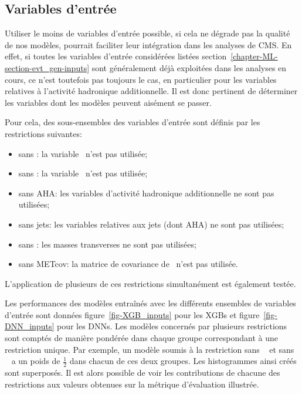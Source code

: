 \subsection{Variables d'entrée}\label{chapter-ML-section-hyperparameters-inputs}
Utiliser le moins de variables d'entrée possible,
si cela ne dégrade pas la qualité de nos modèles,
pourrait faciliter leur intégration dans les analyses de CMS.
En effet,
si toutes les variables d'entrée considérées listées section~\ref{chapter-ML-section-evt_gen-inputs}
sont généralement déjà exploitées dans les analyses en cours,
ce n'est toutefois pas toujours le cas, en particulier pour les variables relatives à l'activité hadronique additionnelle.
Il est donc pertinent de déterminer les variables dont les modèles peuvent aisément se passer.
\par
Pour cela, des sous-ensembles des variables d'entrée sont définis par les restrictions suivantes:
\begin{itemize}
\item sans \Npu: la variable \Npu\ n'est pas utilisée;
\item sans \Nnu: la variable \Nnu\ n'est pas utilisée;
\item sans AHA: les variables d'activité hadronique additionnelle ne sont pas utilisées;
\item sans jets: les variables relatives aux jets (dont AHA) ne sont pas utilisées;
\item sans \mT: les masses transverses ne sont pas utilisées;
\item sans METcov: la matrice de covariance de \MET\ n'est pas utilisée.
\end{itemize}
L'application de plusieurs de ces restrictions simultanément est également testée.
\par
Les performances des modèles entraînés avec les différents ensembles de variables d'entrée sont données
figure~\ref{fig-XGB_inputs} pour les XGBs
et
figure~\ref{fig-DNN_inputs}
pour les DNNs.
Les modèles concernés par plusieurs restrictions sont comptés de manière pondérée dans chaque groupe correspondant à une restriction unique.
Par exemple, un modèle soumis à la restriction \og sans \Npu\ \fg{} et \og sans \Nnu\ \fg{} a un poids de $\frac{1}{2}$ dans chacun de ces deux groupes.
Les histogrammes ainsi créés sont superposés.
Il est alors possible de voir les contributions de chacune des restrictions aux valeurs obtenues sur la métrique d'évaluation illustrée.
